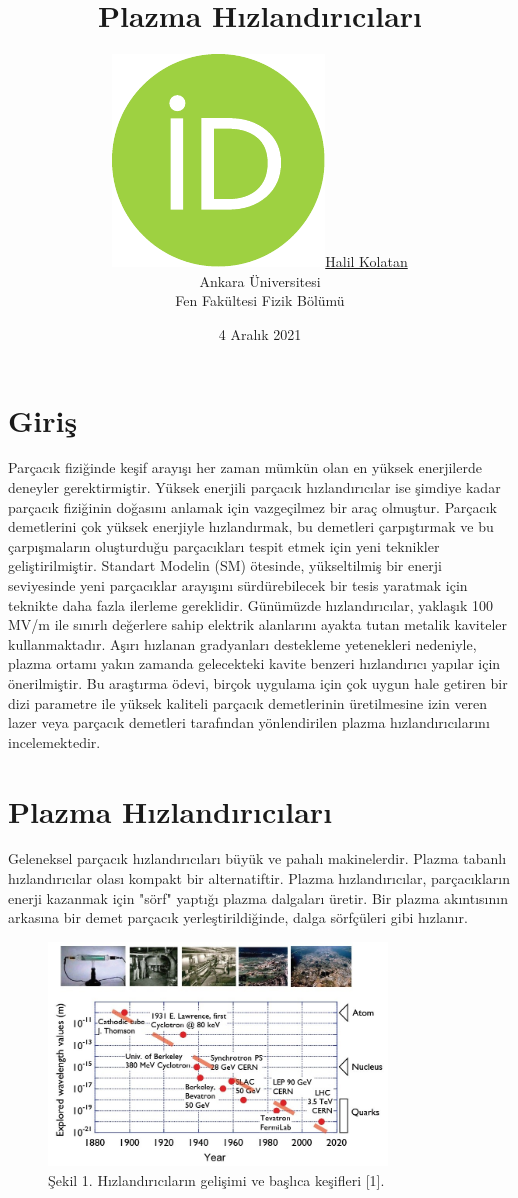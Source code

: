 \documentclass{article}
\title{Plazma Hızlandırıcıları}
\date{4 Aralık 2021}
\author{ \href{https://orcid.org/0000-0002-1684-9602}{\includegraphics[scale=0.06]{orcid.pdf}\hspace{1mm}Halil Kolatan} \\
	Ankara Üniversitesi\\
	Fen Fakültesi 
	Fizik Bölümü }\\
\begin{document}
\maketitle
\begin{abstract}
\tableofcontents
\end{abstract}
\section{Giriş}
 Parçacık fiziğinde keşif arayışı her zaman mümkün olan en yüksek enerjilerde deneyler gerektirmiştir. Yüksek enerjili parçacık hızlandırıcılar ise şimdiye kadar parçacık fiziğinin doğasını anlamak için vazgeçilmez bir araç olmuştur. Parçacık demetlerini çok yüksek enerjiyle hızlandırmak, bu demetleri çarpıştırmak ve bu çarpışmaların oluşturduğu parçacıkları tespit etmek için yeni teknikler geliştirilmiştir. Standart Modelin (SM) ötesinde, yükseltilmiş bir enerji seviyesinde yeni parçacıklar arayışını sürdürebilecek bir tesis yaratmak için teknikte daha fazla ilerleme gereklidir. Günümüzde hızlandırıcılar, yaklaşık 100 MV/m ile sınırlı değerlere sahip elektrik alanlarını ayakta tutan metalik kaviteler kullanmaktadır. Aşırı hızlanan gradyanları destekleme yetenekleri nedeniyle, plazma ortamı yakın zamanda gelecekteki kavite benzeri hızlandırıcı yapılar için önerilmiştir. Bu araştırma ödevi, birçok uygulama için çok uygun hale getiren bir dizi parametre ile yüksek kaliteli parçacık demetlerinin üretilmesine izin veren lazer veya parçacık demetleri tarafından yönlendirilen plazma hızlandırıcılarını  incelemektedir.
 
  \newpage
  
   \section{Plazma Hızlandırıcıları}
   
   Geleneksel parçacık hızlandırıcıları büyük ve pahalı makinelerdir. Plazma tabanlı hızlandırıcılar olası kompakt bir alternatiftir. Plazma hızlandırıcılar, parçacıkların enerji kazanmak için "sörf" yaptığı plazma dalgaları üretir. Bir plazma akıntısının arkasına bir demet parçacık yerleştirildiğinde, dalga sörfçüleri gibi hızlanır.
 
  \begin{figure}[h!]
 \centering
\includegraphics[width=9cm]{ss23.png}
\caption*{Şekil 1. Hızlandırıcıların gelişimi ve başlıca keşifleri [1].}
	\end{figure}
\end{document}
